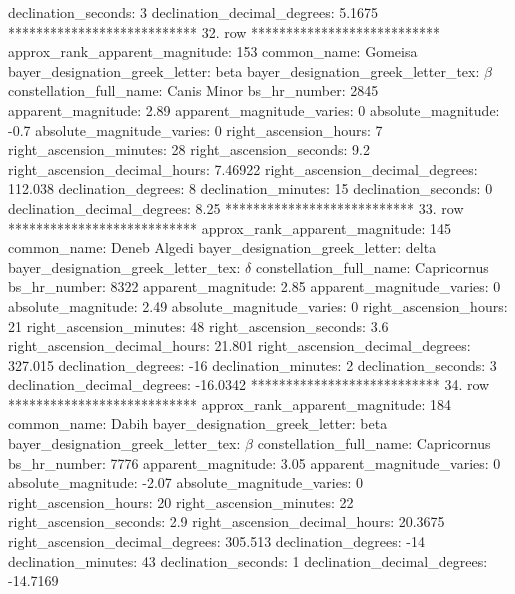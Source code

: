                declination_seconds: 3
       declination_decimal_degrees: 5.1675
*************************** 32. row ***************************
    approx_rank_apparent_magnitude: 153
                       common_name: Gomeisa
    bayer_designation_greek_letter: beta
bayer_designation_greek_letter_tex: $\beta$
           constellation_full_name: Canis Minor
                      bs_hr_number: 2845
                apparent_magnitude: 2.89
         apparent_magnitude_varies: 0
                absolute_magnitude: -0.7
         absolute_magnitude_varies: 0
             right_ascension_hours: 7
           right_ascension_minutes: 28
           right_ascension_seconds: 9.2
     right_ascension_decimal_hours: 7.46922
   right_ascension_decimal_degrees: 112.038
               declination_degrees: 8
               declination_minutes: 15
               declination_seconds: 0
       declination_decimal_degrees: 8.25
*************************** 33. row ***************************
    approx_rank_apparent_magnitude: 145
                       common_name: Deneb Algedi
    bayer_designation_greek_letter: delta
bayer_designation_greek_letter_tex: $\delta$
           constellation_full_name: Capricornus
                      bs_hr_number: 8322
                apparent_magnitude: 2.85
         apparent_magnitude_varies: 0
                absolute_magnitude: 2.49
         absolute_magnitude_varies: 0
             right_ascension_hours: 21
           right_ascension_minutes: 48
           right_ascension_seconds: 3.6
     right_ascension_decimal_hours: 21.801
   right_ascension_decimal_degrees: 327.015
               declination_degrees: -16
               declination_minutes: 2
               declination_seconds: 3
       declination_decimal_degrees: -16.0342
*************************** 34. row ***************************
    approx_rank_apparent_magnitude: 184
                       common_name: Dabih
    bayer_designation_greek_letter: beta
bayer_designation_greek_letter_tex: $\beta$
           constellation_full_name: Capricornus
                      bs_hr_number: 7776
                apparent_magnitude: 3.05
         apparent_magnitude_varies: 0
                absolute_magnitude: -2.07
         absolute_magnitude_varies: 0
             right_ascension_hours: 20
           right_ascension_minutes: 22
           right_ascension_seconds: 2.9
     right_ascension_decimal_hours: 20.3675
   right_ascension_decimal_degrees: 305.513
               declination_degrees: -14
               declination_minutes: 43
               declination_seconds: 1
       declination_decimal_degrees: -14.7169
